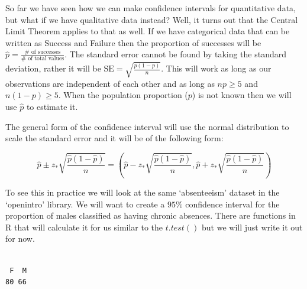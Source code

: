 \documentclass[
  letterpaper,
  DIV=11,
  numbers=noendperiod]{scrreprt}
\newenvironment{Shaded}{\begin{snugshade}}{\end{snugshade}}
\newcommand{\DecValTok}[1]{\textcolor[rgb]{0.68,0.00,0.00}{#1}}
\newcommand{\FunctionTok}[1]{\textcolor[rgb]{0.28,0.35,0.67}{#1}}
\newcommand{\NormalTok}[1]{\textcolor[rgb]{0.00,0.23,0.31}{#1}}
\newcommand{\OtherTok}[1]{\textcolor[rgb]{0.00,0.23,0.31}{#1}}
\newcommand{\SpecialCharTok}[1]{\textcolor[rgb]{0.37,0.37,0.37}{#1}}
\begin{document}
So far we have seen how we can make confidence intervals for
quantitative data, but what if we have qualitative data instead? Well,
it turns out that the Central Limit Theorem applies to that as well. If
we have categorical data that can be written as Success and Failure then
the proportion of successes will be
\(\hat{p}=\frac{\# \text{ of successes}}{\# \text{ of total values}}\).
The standard error cannot be found by taking the standard deviation,
rather it will be \(\text{SE}=\sqrt{\frac{p(1-p)}{n}}\). This will work
as long as our observations are independent of each other and as long as
\(np\geq 5\) and \(n(1-p)\geq 5\). When the population proportion
(\(p\)) is not known then we will use \(\hat{p}\) to estimate it.

The general form of the confidence interval will use the normal
distribution to scale the standard error and it will be of the following
form:

\[ \hat{p} \pm z_* \sqrt{\frac{\hat{p}(1-\hat{p})}{n}} = \left(\hat{p} - z_* \sqrt{\frac{\hat{p}(1-\hat{p})}{n}}, \hat{p} + z_* \sqrt{\frac{\hat{p}(1-\hat{p})}{n}}\right) \]

To see this in practice we will look at the same `absenteeism' dataset
in the `openintro' library. We will want to create a \(95\%\) confidence
interval for the proportion of males classified as having chronic
absences. There are functions in R that will calculate it for us similar
to the \(t.test()\) but we will just write it out for now.

\begin{Shaded}
\end{Shaded}

\begin{verbatim}

 F  M 
80 66 
\end{verbatim}

\begin{Shaded}
\end{Shaded}
\end{document}

